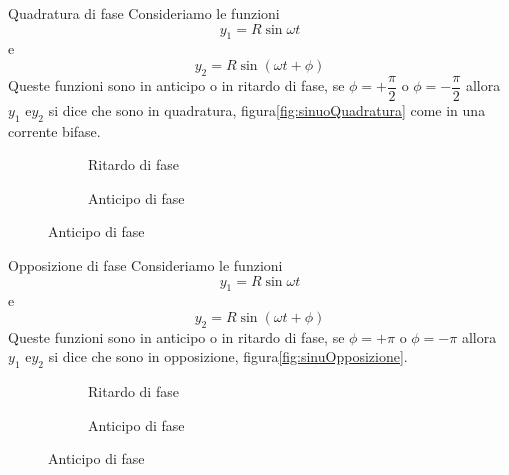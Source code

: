 \begin{definizionet}{Quadratura di fase}{}
	Consideriamo le funzioni \[y_1=R\sin\omega t\] e\[y_2=R\sin(\omega t +\phi)\]Queste funzioni sono in anticipo o in ritardo di fase, se $\phi=+\dfrac{\pi}{2}$ o  $\phi=-\dfrac{\pi}{2}$ allora $y_1$ e$y_2$ si dice che sono in quadratura, figura\nobs\vref{fig:sinuoQuadratura} come in una corrente bifase.
\end{definizionet}
\begin{figure}
	\begin{subfigure}[b]{.5\linewidth}
		\centering
		
		\caption{Ritardo di fase}\label{sinuo2QuadraturaAnticipo}
	\end{subfigure}%
	\begin{subfigure}[b]{.5\linewidth}
		\centering
		
		\caption{Anticipo di fase}\label{fig:sinuo2QuadraturaPosticipo}
	\end{subfigure}
	\label{fig:sinuoQuadratura}
\end{figure}
\begin{definizionet}{Opposizione di fase}{}
	Consideriamo le funzioni \[y_1=R\sin\omega t\] e\[y_2=R\sin(\omega t +\phi)\]Queste funzioni sono in anticipo o in ritardo di fase, se $\phi=+\pi$ o  $\phi=-\pi$ allora $y_1$ e$y_2$ si dice che sono in opposizione, figura\nobs\vref{fig:sinuOpposizione}.
\end{definizionet}
\begin{figure}
	\begin{subfigure}[b]{.5\linewidth}
		\centering
		
		\caption{Ritardo di fase}\label{fig:sinuo2OpposizioneAnticipo}
	\end{subfigure}%
	\begin{subfigure}[b]{.5\linewidth}
		\centering
		
		\caption{Anticipo di fase}\label{fig:sinuo2OpposizionePosticipo}
	\end{subfigure}
	\label{fig:sinuOpposizione}
\end{figure}